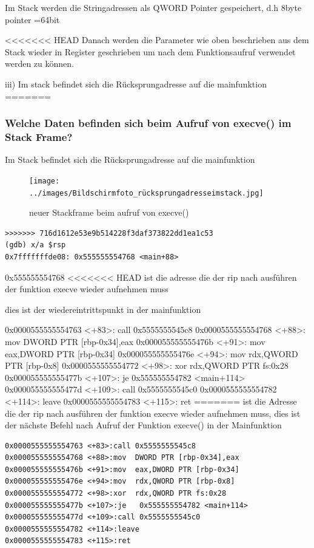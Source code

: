 \documentclass[12pt]{article}
\begin{document}
Im Stack werden die Stringadressen als QWORD Pointer gespeichert, d.h 8byte pointer =64bit

<<<<<<< HEAD
Danach werden die Parameter wie oben beschrieben aus dem Stack wieder in Register geschrieben 
um nach dem Funktionsaufruf verwendet werden zu k\"onnen.


iii)
Im stack befindet sich die R\"ucksprungadresse auf die mainfunktion
=======


\newpage
\subsubsection{Welche Daten befinden sich beim Aufruf von execve() im Stack Frame?}
Im Stack befindet sich die Rücksprungadresse auf die mainfunktion

\begin{figure}[h!]
	\texttt{[image: ../images/Bildschirmfoto\_rücksprungadresseimstack.jpg]}
	\caption{neuer Stackframe beim aufruf von execve()}
\end{figure}

\begin{lstlisting}
>>>>>>> 716d1612e53e9b514228f3daf373822dd1ea1c53
(gdb) x/a $rsp
0x7fffffffde08:	0x555555554768 <main+88>
\end{lstlisting}
0x555555554768
<<<<<<< HEAD
ist die adresse die der rip nach ausf\"uhren der funktion execve wieder aufnehmen muss

dies ist der wiedereintrittspunkt in der mainfunktion

0x0000555555554763 <+83>:	call   0x5555555545c8
0x0000555555554768 <+88>:	mov    DWORD PTR [rbp-0x34],eax
0x000055555555476b <+91>:	mov    eax,DWORD PTR [rbp-0x34]
0x000055555555476e <+94>:	mov    rdx,QWORD PTR [rbp-0x8]
0x0000555555554772 <+98>:	xor    rdx,QWORD PTR fs:0x28
0x000055555555477b <+107>:	je     0x555555554782 <main+114>
0x000055555555477d <+109>:	call   0x5555555545c0
0x0000555555554782 <+114>:	leave  
0x0000555555554783 <+115>:	ret    
=======
ist die Adresse die der rip nach ausführen der funktion execve wieder aufnehmen muss,
dies ist der nächste Befehl nach Aufruf der Funktion execve() in der Mainfunktion
\begin{lstlisting}
0x0000555555554763 <+83>:call 0x5555555545c8
0x0000555555554768 <+88>:mov  DWORD PTR [rbp-0x34],eax
0x000055555555476b <+91>:mov  eax,DWORD PTR [rbp-0x34]
0x000055555555476e <+94>:mov  rdx,QWORD PTR [rbp-0x8]
0x0000555555554772 <+98>:xor  rdx,QWORD PTR fs:0x28
0x000055555555477b <+107>:je   0x555555554782 <main+114>
0x000055555555477d <+109>:call 0x5555555545c0
0x0000555555554782 <+114>:leave  
0x0000555555554783 <+115>:ret    
\end{lstlisting}
\end{document}
